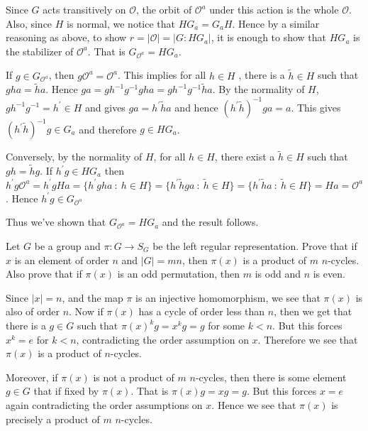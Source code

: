 \documentclass[12pt]{exam}
\theoremstyle{plain} %
\theoremstyle{definition} %
\theoremstyle{remark} %
\begin{document}
\begin{questions}
\begin{solution}
\begin{parts}
      Since $G$ acts transitively on $\mathcal{O}$, the orbit of
      $\mathcal{O}^a$ under this action is the whole $\mathcal{O}$.
      Also, since $H$ is normal, we notice that $HG_a = G_aH$.
      Hence by a similar reasoning as above, to show $ r = |\mathcal{O}| = |G :
      HG_a|$, it is enough to show that $HG_a$ is the stabilizer of
      $\mathcal{O}^a$. That is $G_{\mathcal{O}^a} = HG_a$.

      If $g \in G_{\mathcal{O}^a}$, then $g \mathcal{O}^a =
      \mathcal{O}^a$. This implies for all $h \in H$ , there is a
      $\tilde{h} \in H$ such that $gha = \tilde{h}a$. Hence
      $ga = gh^{-1}g^{-1}gha = gh^{-1}g^{-1} \tilde{h}a$. By the
      normality of $H$, $ gh^{-1}g^{-1} = h^\prime \in H$ and gives
      $ga = h^\prime \tilde{h}a$ and hence $(h^\prime \tilde{h})^{-1}
      g a = a$. This gives $(h^\prime \tilde{h})^{-1}g \in G_a$ and
      therefore $g \in HG_a$.

      Conversely, by the normality of $H$, for all $h \in H$, there
      exist a $\tilde{h} \in H$ such that $gh = \tilde{h}g$. If
      $h^\prime g \in HG_a$ then $h^\prime g \mathcal{O}^a = h^\prime
      gHa = \{ h^\prime gha  \ : \ h \in H  \} = \{ h^\prime
      \tilde{h}ga  \ : \ \tilde{h} \in H  \} = \{ h^\prime
      \tilde{h}a  \ : \  \tilde{h} \in H \} = Ha = \mathcal{O}^a$.
      Hence $h^\prime g \in G_{\mathcal{O}^a}$

      Thus we've shown that $G_{\mathcal{O}^{a}} = HG_a$ and the result follows.

    \end{parts}

  \end{solution}

  \question
  Let $G$ be a group and $ \pi: G \to S_G$ be the left regular
  representation. Prove that if $x$ is an element of order $n$ and
  $|G| = mn$, then $\pi(x)$ is a product of $m$ $n$-cycles. Also
  prove that if $\pi(x)$ is an odd permutation, then $m$ is odd and $n$ is even.
  \begin{solution}
    Since $|x| = n$, and the map $\pi$ is an injective homomorphism, we see that
    $\pi(x)$ is also of order $n$.
    Now if $\pi(x)$ has a cycle of order less than $n$, then we get
    that there is a $g \in G$ such that $\pi(x)^kg = x^kg = g$ for
    some $k < n$. But this forces $x^k = e$ for $k < n$,
    contradicting the order assumption on $x$. Therefore we see that
    $\pi(x)$ is a product of $n$-cycles.

    Moreover, if $\pi(x)$ is not a product of $m$ $n$-cycles, then
    there is some element $g \in G$ that if fixed by $\pi(x)$. That
    is $\pi(x)g = xg = g$. But this forces $x = e$ again
    contradicting the order assumptions on $x$.
    Hence we see that $\pi(x)$ is precisely a product of $m$ $n$-cycles.


\end{solution}
\end{questions}
\end{document}
